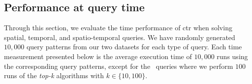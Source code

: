 






	\subsection{Performance at query time}
	\label{sec:ctr:exp:queries}
	Through this section, we evaluate the time performance of \gls{ctr} when solving spatial, temporal, and spatio-temporal queries.
	We have randomly generated $10,\!000$ query patterns from our two datasets for each type of query.
	Each time measurement presented below is the average execution time of $10,\!000$ runs using the corresponding query patterns, 
	except for the \topK\ queries where we perform $100$ runs of the {\em top-k} algorithms with $k\in\{10,100\}$.


